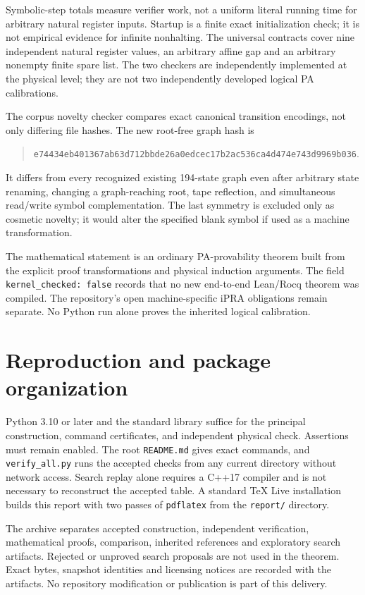 \documentclass[11pt,letterpaper]{article}
\newcommand{\file}[1]{\texttt{\nolinkurl{#1}}}
\begin{document}
Symbolic-step totals measure verifier work, not a uniform literal running
 time for arbitrary natural register inputs. Startup is a finite exact
initialization check; it is not empirical evidence for infinite nonhalting.
The universal contracts cover nine independent natural register values,
an arbitrary affine gap and an arbitrary nonempty finite spare list.
The two checkers are independently implemented at the physical level;
they are not two independently developed logical PA calibrations.

The corpus novelty checker compares exact canonical transition encodings,
not only differing file hashes. The new root-free graph hash is
\begin{quote}\small
\nolinkurl{e74434eb401367ab63d712bbde26a0edcec17b2ac536ca4d474e743d9969b036}.
\end{quote}
It differs from every recognized existing 194-state graph even after
arbitrary state renaming, changing a graph-reaching root, tape reflection,
and simultaneous read/write symbol complementation. The last symmetry
is excluded only as cosmetic novelty; it would alter the specified blank
symbol if used as a machine transformation.

The mathematical statement is an ordinary PA-provability theorem built
from the explicit proof transformations and physical induction arguments.
The field \file{kernel_checked: false} records that no new end-to-end
Lean/Rocq theorem was compiled. The repository's open machine-specific
iPRA obligations remain separate. No Python run alone proves the inherited
logical calibration.




\section{Reproduction and package organization}

Python 3.10 or later and the standard library suffice for the principal
construction, command certificates, and independent physical check.
Assertions must remain enabled. The root \file{README.md} gives exact
commands, and \file{verify_all.py} runs the accepted checks from any
current directory without network access. Search replay alone requires
a C++17 compiler and is not necessary to reconstruct the accepted table.
A standard TeX Live installation builds this report with two passes of
\file{pdflatex} from the \file{report/} directory.

The archive separates accepted construction, independent verification,
mathematical proofs, comparison, inherited references and exploratory
search artifacts. Rejected or unproved search proposals are not used in
the theorem. Exact bytes, snapshot identities and licensing notices are
recorded with the artifacts. No repository modification or publication
is part of this delivery.
\end{document}
